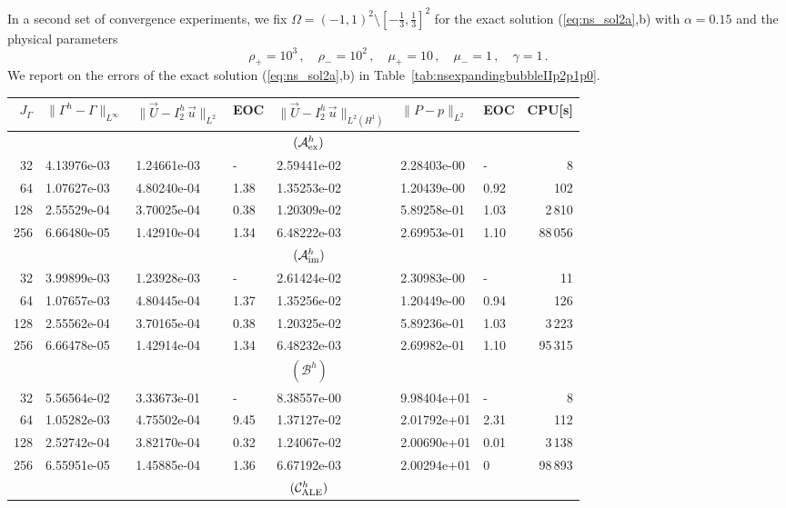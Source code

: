 \documentclass[a4paper,12pt,onecolumn]{article}
\newcommand{\errorXx}{\|\Gamma^h - \Gamma\|_{L^\infty}}
\newcommand{\LerrorUu}[1]{\|\vec U - I^h_{#1}\,\vec u\|_{L^2}}
\newcommand{\HerrorUu}[1]{\|\vec U - I^h_{#1}\,\vec u\|_{L^2(H^1)}}
\newcommand{\LerrorPp}{\|P - p\|_{L^2}}
\newcommand{\schemeAex}{{\mathcal{A}^h_{\rm ex}}}
\newcommand{\schemeAim}{{\mathcal{A}^h_{\rm im}}}
\newcommand{\schemeB}{{\mathcal{B}^h}}
\newcommand{\schemeALE}{{\mathcal{C}^h_{\rm ALE}}}
\begin{document}
In a second set of convergence experiments, we fix
$\Omega = (-1,1)^2 \setminus[-\frac13,\frac13]^2$
for the exact solution (\ref{eq:ns_sol2a},b) with $\alpha=0.15$ and
the physical parameters
\[
\rho_+ = 10^3\,,\quad \rho_- = 10^2\,,\quad \mu_+ = 10\,,\quad \mu_- = 1\,,\quad
\gamma = 1\,.
\]
We report on the errors of the exact solution (\ref{eq:ns_sol2a},b) in
Table~\ref{tab:nsexpandingbubbleIIp2p1p0}.
\begin{table}
\center
\hspace*{-3.25cm}
\begin{tabular}{rllllllr}
\hline
$J_\Gamma$ & $\errorXx$ & $\LerrorUu2$ & EOC & $\HerrorUu2$ & $\LerrorPp$ & EOC
& CPU[s] \\
\hline
& \multicolumn{7}{c}{$(\schemeAex)$} \\
\hline
 32 & 4.13976e-03 & 1.24661e-03 &    - & 2.59441e-02 & 2.28403e-00 &    - &
8 \\
 64 & 1.07627e-03 & 4.80240e-04 & 1.38 & 1.35253e-02 & 1.20439e-00 & 0.92 &
102 \\
128 & 2.55529e-04 & 3.70025e-04 & 0.38 & 1.20309e-02 & 5.89258e-01 & 1.03 &
2\,810 \\
256 & 6.66480e-05 & 1.42910e-04 & 1.34 & 6.48222e-03 & 2.69953e-01 & 1.10 &
88\,056 \\
\hline
& \multicolumn{7}{c}{$(\schemeAim)$} \\
\hline
 32 & 3.99899e-03 & 1.23928e-03 &    - & 2.61424e-02 & 2.30983e-00 &    - &
11 \\
 64 & 1.07657e-03 & 4.80445e-04 & 1.37 & 1.35256e-02 & 1.20449e-00 & 0.94 &
126 \\
128 & 2.55562e-04 & 3.70165e-04 & 0.38 & 1.20325e-02 & 5.89236e-01 & 1.03 &
3\,223 \\
256 & 6.66478e-05 & 1.42914e-04 & 1.34 & 6.48232e-03 & 2.69982e-01 & 1.10 &
95\,315 \\
\hline
& \multicolumn{7}{c}{$(\schemeB)$} \\
\hline
 32 & 5.56564e-02 & 3.33673e-01 &    - & 8.38557e-00 & 9.98404e+01 &    - &
8 \\
 64 & 1.05282e-03 & 4.75502e-04 & 9.45 & 1.37127e-02 & 2.01792e+01 & 2.31 &
112 \\
128 & 2.52742e-04 & 3.82170e-04 & 0.32 & 1.24067e-02 & 2.00690e+01 & 0.01 &
3\,138 \\
256 & 6.55951e-05 & 1.45885e-04 & 1.36 & 6.67192e-03 & 2.00294e+01 &    0 &
98\,893 \\
\hline
& \multicolumn{7}{c}{$(\schemeALE)$} \\
\hline

\end{tabular}
\end{table}
\end{document}
